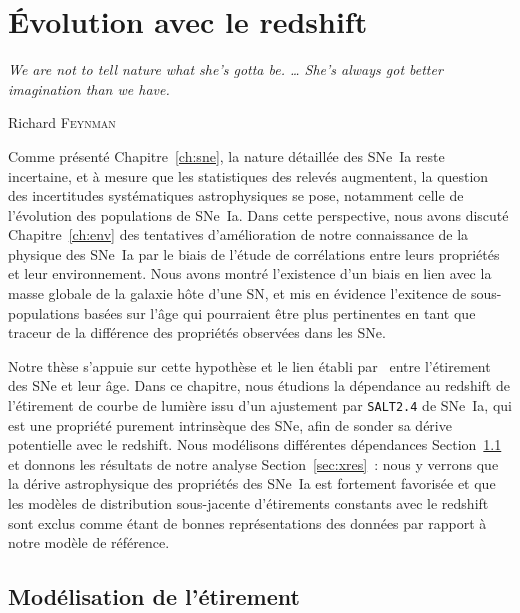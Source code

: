 \documentclass[../main/main.tex]{subfiles}
\begin{document}
\raggedbottom


\chapter{\'Evolution avec le redshift}\label{ch:stretch}
\epigraph{\openquote\textit{We are not to tell nature what she's gotta be. …
She's always got better imagination than we have.}\closequote}{Richard
\textsc{Feynman}}

Comme présenté Chapitre~\ref{ch:sne}, la nature détaillée des SNe~Ia reste
incertaine, et à mesure que les statistiques des relevés augmentent, la question
des incertitudes systématiques astrophysiques se pose, notamment celle de
l'évolution des populations de SNe~Ia. Dans cette perspective, nous avons
discuté Chapitre~\ref{ch:env} des tentatives d'amélioration de notre
connaissance de la physique des SNe~Ia par le biais de l'étude de corrélations
entre leurs propriétés et leur environnement. Nous avons montré l'existence d'un
biais en lien avec la masse globale de la galaxie hôte d'une SN, et mis en
évidence l'exitence de sous-populations basées sur l'âge qui pourraient être
plus pertinentes en tant que traceur de la différence des propriétés observées
dans les SNe.

Notre thèse s'appuie sur cette hypothèse et le lien établi
par~\cite{rigault2020} entre l'étirement des SNe et leur âge. Dans ce chapitre,
nous étudions la dépendance au redshift de l'étirement de courbe de lumière issu
d'un ajustement par \texttt{SALT2.4} de SNe~Ia, qui est une propriété purement
intrinsèque des SNe, afin de sonder sa dérive potentielle avec le redshift. Nous
modélisons différentes dépendances Section~\ref{sec:xmod} et donnons les
résultats de notre analyse Section~\ref{sec:xres}~: nous y verrons que la dérive
astrophysique des propriétés des SNe~Ia est fortement favorisée et que les
modèles de distribution sous-jacente d'étirements constants avec le redshift
sont exclus comme étant de bonnes représentations des données par rapport à
notre modèle de référence.

\vfill
\minitoc
\vfill

\newpage

\section{Modélisation de l'étirement}\label{sec:xmod}
\end{document}
